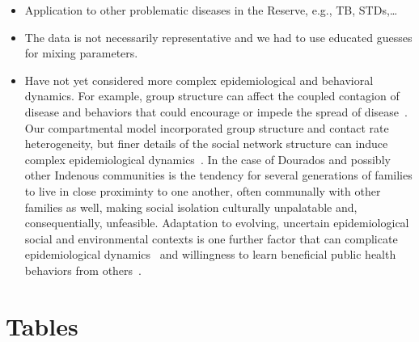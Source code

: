 \documentclass[
  letterpaper,
  abstract]{scrartcl}
\begin{document}
\begin{itemize}
  \item 
    Application to other problematic diseases in the Reserve, e.g., TB, STDs,\ldots 
  \item
    The data is not necessarily representative and we had to use educated guesses
    for mixing parameters.
  \item
    Have not yet considered more complex epidemiological and behavioral
    dynamics. For example, group structure can affect the coupled contagion of
    disease and behaviors that could encourage or impede the spread of
    disease~\autocite{SmaldinoJones2021}. Our compartmental model
    incorporated group structure and contact rate heterogeneity, but finer
    details of the social network structure can induce complex
    epidemiological dynamics~\autocite{Arthur2017}. In the case of Dourados
    and possibly other Indenous communities is the tendency for several
    generations of families to live in close proximinty to one another,
    often communally with other families as well, making social isolation
    culturally unpalatable and, consequentially, unfeasible. Adaptation to
    evolving, uncertain epidemiological social and environmental contexts is
    one further factor that can complicate epidemiological
    dynamics~\autocite{Arthur2021} and willingness to learn beneficial public
    health behaviors from others~\autocite{Turner2023a}.
\end{itemize}


\printbibliography[title=References]


\clearpage

\section{Tables}
\end{document}
